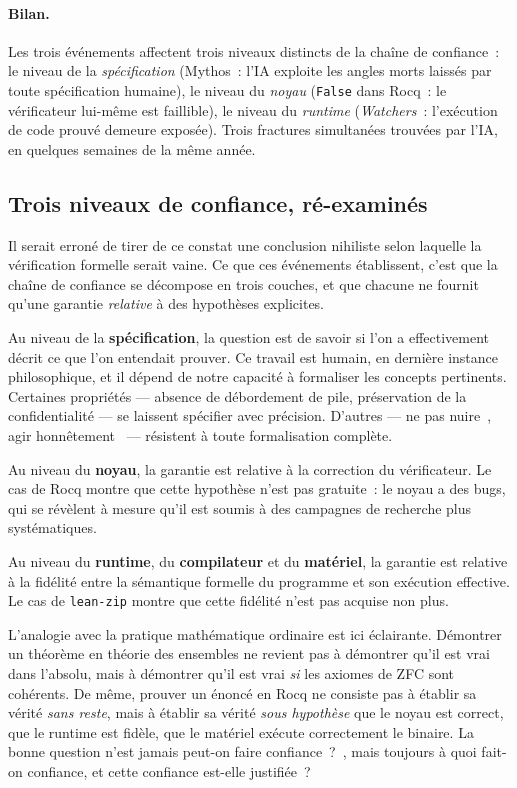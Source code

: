 \documentclass[11pt,a4paper]{article}
\begin{document}
\paragraph{Bilan.} Les trois événements affectent trois niveaux distincts de la chaîne de confiance~: le niveau de la \emph{spécification} (Mythos~: l'IA exploite les angles morts laissés par toute spécification humaine), le niveau du \emph{noyau} (\texttt{False} dans Rocq~: le vérificateur lui-même est faillible), le niveau du \emph{runtime} (\emph{Watchers}~: l'exécution de code prouvé demeure exposée). Trois fractures simultanées trouvées par l'IA, en quelques semaines de la même année.

\subsection{Trois niveaux de confiance, ré-examinés}

Il serait erroné de tirer de ce constat une conclusion nihiliste selon laquelle la vérification formelle serait vaine. Ce que ces événements établissent, c'est que la chaîne de confiance se décompose en trois couches, et que chacune ne fournit qu'une garantie \emph{relative} à des hypothèses explicites.

Au niveau de la \textbf{spécification}, la question est de savoir si l'on a effectivement décrit ce que l'on entendait prouver. Ce travail est humain, en dernière instance philosophique, et il dépend de notre capacité à formaliser les concepts pertinents. Certaines propriétés --- absence de débordement de pile, préservation de la confidentialité --- se laissent spécifier avec précision. D'autres --- \og ne pas nuire~\fg{}, \og agir honnêtement~\fg{} --- résistent à toute formalisation complète. 

Au niveau du \textbf{noyau}, la garantie est relative à la correction du vérificateur. Le cas de Rocq montre que cette hypothèse n'est pas gratuite~: le noyau a des bugs, qui se révèlent à mesure qu'il est soumis à des campagnes de recherche plus systématiques.

Au niveau du \textbf{runtime}, du \textbf{compilateur} et du \textbf{matériel}, la garantie est relative à la fidélité entre la sémantique formelle du programme et son exécution effective. Le cas de \texttt{lean-zip} montre que cette fidélité n'est pas acquise non plus.

L'analogie avec la pratique mathématique ordinaire est ici éclairante. Démontrer un théorème en théorie des ensembles ne revient pas à démontrer qu'il est vrai dans l'absolu, mais à démontrer qu'il est vrai \emph{si} les axiomes de ZFC sont cohérents. De même, prouver un énoncé en Rocq ne consiste pas à établir sa vérité \emph{sans reste}, mais à établir sa vérité \emph{sous hypothèse} que le noyau est correct, que le runtime est fidèle, que le matériel exécute correctement le binaire. La bonne question n'est jamais \og peut-on faire confiance~?~\fg, mais toujours \og à quoi fait-on confiance, et cette confiance est-elle justifiée~?~\fg
\end{document}
